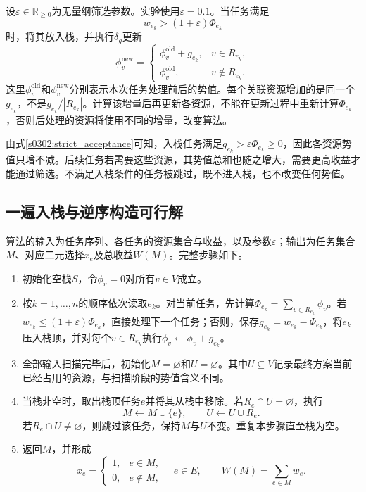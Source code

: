 设$\varepsilon\in\mathbb{R}_{\geq0}$为无量纲筛选参数。实验使用$\varepsilon=0.1$。当任务满足
\begin{equation}
 w_{e_k}>(1+\varepsilon)\Phi_{e_k}
\label{s0302:strict_acceptance}
\end{equation}
时，将其放入栈，并执行$\delta_g$更新
\begin{equation}
 \phi_v^{\mathrm{new}}=
 \begin{cases}
 \phi_v^{\mathrm{old}}+g_{e_k},&v\in R_{e_k},\\
 \phi_v^{\mathrm{old}},&v\notin R_{e_k}.
 \end{cases}
\label{s0302:gain_update}
\end{equation}
这里$\phi_v^{\mathrm{old}}$和$\phi_v^{\mathrm{new}}$分别表示本次任务处理前后的势值。每个关联资源增加的是同一个$g_{e_k}$，不是$g_{e_k}/|R_{e_k}|$。计算该增量后再更新各资源，不能在更新过程中重新计算$\Phi_{e_k}$，否则后处理的资源将使用不同的增量，改变算法。

由式\eqref{s0302:strict_acceptance}可知，入栈任务满足$g_{e_k}>\varepsilon\Phi_{e_k}\geq0$，因此各资源势值只增不减。后续任务若需要这些资源，其势值总和也随之增大，需要更高收益才能通过筛选。不满足入栈条件的任务被跳过，既不进入栈，也不改变任何势值。

\subsection{一遍入栈与逆序构造可行解}

算法的输入为任务序列、各任务的资源集合与收益，以及参数$\varepsilon$；输出为任务集合$M$、对应二元选择$x_e$及总收益$W(M)$。完整步骤如下。

\begin{enumerate}
 \item 初始化空栈$S$，令$\phi_v=0$对所有$v\in V$成立。
 \item 按$k=1,\ldots,n$的顺序依次读取$e_k$。对当前任务，先计算$\Phi_{e_k}=\sum_{v\in R_{e_k}}\phi_v$。若$w_{e_k}\leq(1+\varepsilon)\Phi_{e_k}$，直接处理下一个任务；否则，保存$g_{e_k}=w_{e_k}-\Phi_{e_k}$，将$e_k$压入栈顶，并对每个$v\in R_{e_k}$执行$\phi_v\leftarrow\phi_v+g_{e_k}$。
 \item 全部输入扫描完毕后，初始化$M=\varnothing$和$U=\varnothing$。其中$U\subseteq V$记录最终方案当前已经占用的资源，与扫描阶段的势值含义不同。
 \item 当栈非空时，取出栈顶任务$e$并将其从栈中移除。若$R_e\cap U=\varnothing$，执行
 \begin{equation}
 M\leftarrow M\cup\{e\},\qquad
 U\leftarrow U\cup R_e.
 \label{s0302:reverse_acceptance}
 \end{equation}
 若$R_e\cap U\ne\varnothing$，则跳过该任务，保持$M$与$U$不变。重复本步骤直至栈为空。
 \item 返回$M$，并形成
 \begin{equation}
 x_e=
 \begin{cases}
 1,&e\in M,\\
 0,&e\notin M,
 \end{cases}
 \quad e\in E,
 \qquad
 W(M)=\sum_{e\in M}w_e.
 \label{s0302:output}
 \end{equation}
\end{enumerate}

